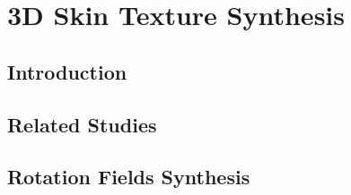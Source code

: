
\chapter{3D Skin Texture Synthesis} %

\label{Chapter3} %



\section{Introduction}


\section{Related Studies}


\section{Rotation Fields Synthesis}
